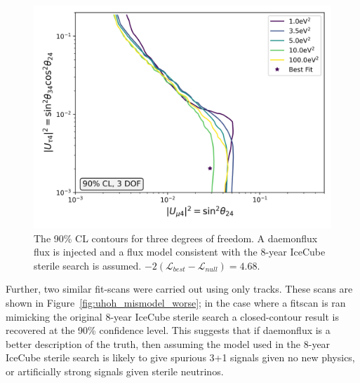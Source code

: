 \documentclass[main.tex]{subfiles}
\begin{document}
\begin{figure}  
    \centering
    \includegraphics[width=0.7\linewidth]{figures/joint_daemon_mismodel_Realization_daemon_Asimov_sterile_0_cl0.9_dof3.png}
    \caption{The 90\% CL contours for three degrees of freedom. A daemonflux flux is injected and a flux model consistent with the 8-year IceCube sterile search is assumed. $-2(\mathcal{L}_{best}-\mathcal{L}_{null})=4.68$.}\label{fig:uhoh_mismodel}
\end{figure}

Further, two similar fit-scans were carried out using only tracks. 
These scans are shown in Figure~\ref{fig:uhoh_mismodel_worse}; in the case where a fitscan is ran mimicking the original 8-year IceCube sterile search a closed-contour result is recovered at the 90\% confidence level. 
This suggests that if daemonflux is a better description of the truth, then assuming the model used in the 8-year IceCube sterile search is likely to give spurious 3+1 signals given no new physics, or artificially strong signals given sterile neutrinos.
\end{document}
